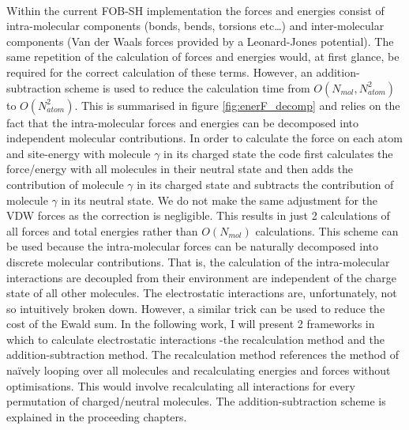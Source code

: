 \\
Within the current FOB-SH implementation the forces and energies consist of intra-molecular components (bonds, bends, torsions etc\ldots) and inter-molecular components (Van der Waals forces provided by a Leonard-Jones potential). The same repetition of the calculation of forces and energies would, at first glance, be required for the correct calculation of these terms. However, an addition-subtraction scheme is used to reduce the calculation time from $O(N_{mol}, N_{atom}^2)$ to $O(N_{atom}^2)$. This is summarised in figure \ref{fig:enerF_decomp} and relies on the fact that the intra-molecular forces and energies can be decomposed into independent molecular contributions. In order to calculate the force on each atom and site-energy with molecule $\gamma$ in its charged state the code first calculates the force/energy with all molecules in their neutral state and then adds the contribution of molecule $\gamma$ in its charged state and subtracts the contribution of molecule $\gamma$ in its neutral state. We do not make the same adjustment for the VDW forces as the correction is negligible. This results in just 2 calculations of all forces and total energies rather than $O(N_{mol})$ calculations. This scheme can be used because the intra-molecular forces can be naturally decomposed into discrete molecular contributions. That is, the calculation of the intra-molecular interactions are decoupled from their environment are independent of the charge state of all other molecules. The electrostatic interactions are, unfortunately, not so intuitively broken down. However, a similar trick can be used to reduce the cost of the Ewald sum. In the following work, I will present 2 frameworks in which to calculate electrostatic interactions -the recalculation method and the addition-subtraction method. The recalculation method references the method of na\"ively looping over all molecules and recalculating energies and forces without optimisations. This would involve recalculating all interactions for every permutation of charged/neutral molecules. The addition-subtraction scheme is explained in the proceeding chapters.
